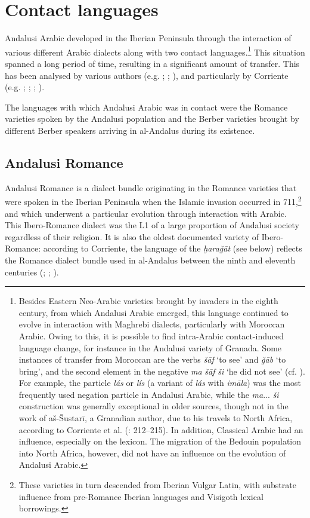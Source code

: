 \documentclass[output=paper,modfonts,nonflat]{langsci/langscibook}
\begin{document}
\section{Contact languages}
Andalusi Arabic developed in the Iberian Peninsula through the interaction of various different Arabic dialects along with two contact languages.\footnote{Besides Eastern Neo-Arabic varieties brought by invaders in the eighth century, from which Andalusi Arabic emerged, this language continued to evolve in interaction with Maghrebi dialects, particularly with Moroccan Arabic. Owing to this, it is possible to find intra-Arabic contact-induced language change, for instance in the Andalusi variety of Granada. Some instances of transfer from Moroccan are the verbs \textit{šāf} ‘to see’ and \textit{ǧāb} ‘to bring’, and the second element in the negative \textit{ma} \textit{šāf} \textit{ši} ‘he did not see’ (cf. \citealt[57]{Corriente1998stress}). For example, the particle \textit{lás} or \textit{lís} (a variant of \textit{lás} with \textit{imāla})  was the most frequently used negation particle in Andalusi Arabic, while the \textit{ma}... \textit{ši} construction was generally exceptional in older sources, though not in the work of aš-Šustarī, a Granadian author, due to his travels to North Africa, according to Corriente et al. (\citeyear{CorrientePereiraVicente2015}: 212--215). In addition, Classical Arabic had an influence, especially on the lexicon. The migration of the Bedouin population into North Africa, however, did not have an influence on the evolution of Andalusi Arabic.} This situation spanned a long period of time, resulting in a significant amount of transfer. This has been analysed by various authors (e.g. \citealt{Ferrando1995}; \citeyear{Ferrando1997}; \citealt{Vicente2006}), and particularly by Corriente (e.g. \citealt{Corriente1981}; \citeyear{Corriente1992book}; \citeyear{Corriente2000}; \citeyear{Corriente2002}). 

The languages with which Andalusi Arabic was in contact were the Romance varieties spoken by the Andalusi population and the Berber varieties brought by different Berber speakers arriving in al-Andalus during its existence. 

\subsection{Andalusi Romance}\label{AR}

Andalusi Romance is a dialect bundle originating in the Romance varieties that were spoken in the Iberian Peninsula when the Islamic invasion occurred in 711,\footnote{These varieties in turn descended from Iberian Vulgar Latin, with substrate influence from pre-Romance Iberian languages and Visigoth lexical borrowings.} and  which underwent a particular evolution through interaction with Arabic. This Ibero-Romance dialect was the L1 of a large proportion of Andalusi society regardless of their religion. It is also the oldest documented variety of Ibero-Romance: according to Corriente, the language of the \textit{ḫaraǧāt} (see below) reflects the Romance dialect bundle used in al-Andalus between the ninth and eleventh centuries (\citealt{Corriente1995}; \citeyear{Corriente1997poetry}; \citeyear{Corriente2000}). 
\end{document}
